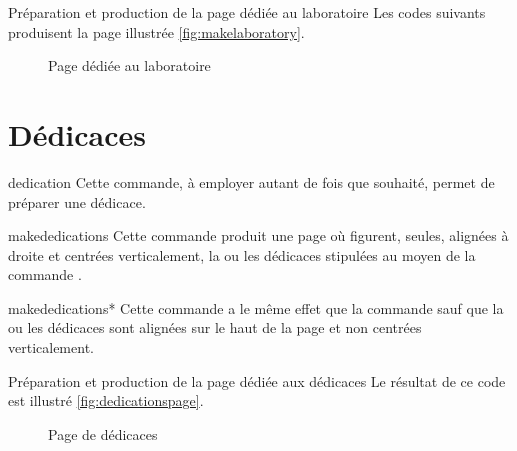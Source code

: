 \begin{dbexample}{Préparation et production de la page dédiée au laboratoire}{}
  Les codes suivants produisent la page illustrée \vref{fig:makelaboratory}.
  \NoAutoSpacing%
%
\end{dbexample}

\begin{figure}[htbp]
  \centering {}
  \caption{Page dédiée au laboratoire}
  \label{fig:makelaboratory}
\end{figure}

\section{Dédicaces}

\begin{docCommand}{dedication}{}
  Cette commande, à employer autant de fois que
  souhaité\hauteurpage{}, permet de préparer une dédicace.
\end{docCommand}

\begin{docCommand}{makededications}{}
  Cette commande produit une page où figurent, seules,
  alignées à droite et centrées verticalement, la ou les dédicaces stipulées au
  moyen de la commande .
\end{docCommand}
%
\begin{docCommand}{makededications*}{}
  Cette commande a le même effet que la commande
   sauf que la ou les dédicaces sont alignées sur le
  haut de la page et non centrées verticalement.
\end{docCommand}

\begin{dbexample}{Préparation et production de la page dédiée aux dédicaces}{}
  \NoAutoSpacing%
%
  Le résultat de ce code est illustré \vref{fig:dedicationspage}.
\end{dbexample}

\begin{figure}[htbp]
  \centering {}%
  \caption{Page de dédicaces}
  \label{fig:dedicationspage}
\end{figure}


